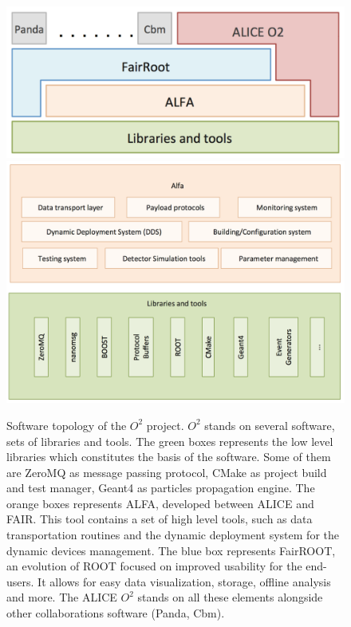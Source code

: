 \begin{figure}[!ht]
\begin{center}
\includegraphics[width=0.8\linewidth]{Chapters/O2/Figs/O2_soft_tree.pdf}
\includegraphics[width=0.7\linewidth]{Chapters/O2/Figs/ALFA.pdf}
\caption{Software topology of the $O^2$ project. $O^2$ stands on several software, sets of libraries and tools. The green boxes represents the low level libraries which constitutes the basis of the software. Some of them are ZeroMQ as message passing protocol, CMake as project build and test manager, Geant4 as particles propagation engine. The orange boxes represents ALFA, developed between ALICE and FAIR. This tool contains a set of high level tools, such as data transportation routines and the dynamic deployment system for the dynamic devices management. The blue box represents FairROOT, an evolution of ROOT focused on improved usability for the end-users. It allows for easy data visualization, storage, offline analysis and more. The ALICE $O^2$ stands on all these elements alongside other collaborations software (Panda, Cbm).}
\label{fig:O2_soft_tree}
\end{center}
\end{figure}

